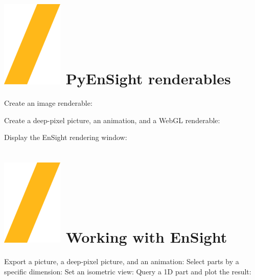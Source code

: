 \documentclass[9pt,landscape]{article}
\begin{document}
\begin{multicols}{3}


\section{\includegraphics[height=\fontcharht\font`\S]{slash.png} PyEnSight renderables}

Create an image renderable:



Create a deep-pixel picture, an animation, and a WebGL renderable:

Display the EnSight rendering window:


\section{{\includegraphics[height=\fontcharht\font`\S]{slash.png}  Working with EnSight}}

Export a picture, a deep-pixel picture, and an animation:
Select parts by a specific dimension:
Set an isometric view: 
Query a 1D part and plot the result:



\end{multicols}
\end{document}
